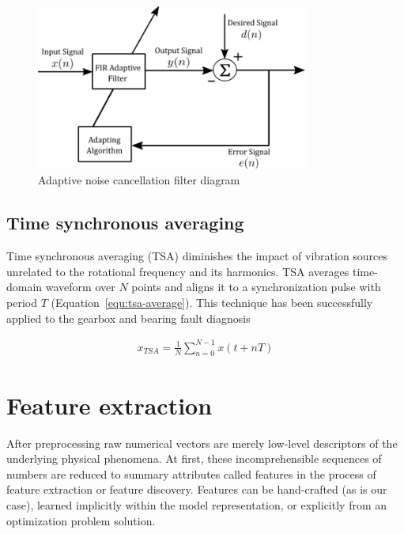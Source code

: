 \begin{figure}[h]
	\centering
	\includegraphics[width=0.8\textwidth]{assets/adaptive-filter.png}
	\caption{Adaptive noise cancellation filter diagram}
	\label{fig:adaptive-filter}
\end{figure}
\bigbreak

\subsection{Time synchronous averaging}
Time synchronous averaging (TSA) diminishes the impact of vibration sources unrelated to the rotational frequency and its harmonics. TSA averages time-domain waveform over $N$ points and aligns it to a synchronization pulse with period $T$ (Equation~\ref{equ:tsa-average}). This technique has been successfully applied to the gearbox and bearing fault diagnosis~\cite{davies_handbook_2012,nandi_condition_2019}

\begin{ceqn}\begin{align}
x_{TSA} = \frac{1}{N} \sum_{n = 0}^{N - 1}{x(t + nT)}
\label{equ:tsa-average}
\end{align}\end{ceqn} 

\section{Feature extraction} \label{section:feature-extraction}
After preprocessing raw numerical vectors are merely low-level descriptors of the underlying physical phenomena. At first, these incomprehensible sequences of numbers are reduced to summary attributes called features in the process of feature extraction or feature discovery. Features can be hand-crafted (as is our case), learned implicitly within the model representation, or explicitly from an optimization problem solution. 

